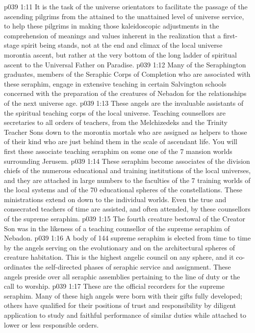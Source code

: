 \vs p039 1:11 It is the task of the universe orientators to facilitate the passage of the ascending pilgrims from the attained to the unattained level of universe service, to help these pilgrims in making those kaleidoscopic adjustments in the comprehension of meanings and values inherent in the realization that a first\hyp{}stage spirit being stands, not at the end and climax of the local universe morontia ascent, but rather at the very bottom of the long ladder of spiritual ascent to the Universal Father on Paradise.
\vs p039 1:12 Many of the Seraphington graduates, members of the Seraphic Corps of Completion who are associated with these seraphim, engage in extensive teaching in certain Salvington schools concerned with the preparation of the creatures of Nebadon for the relationships of the next universe age.
\vs p039 1:13 \bibnobreakspace {} These angels are the invaluable assistants of the spiritual teaching corps of the local universe. Teaching counsellors are secretaries to all orders of teachers, from the Melchizedeks and the Trinity Teacher Sons down to the morontia mortals who are assigned as helpers to those of their kind who are just behind them in the scale of ascendant life. You will first  these associate teaching seraphim on some one of the 7 mansion worlds surrounding Jerusem.
\vs p039 1:14 These seraphim become associates of the division chiefs of the numerous educational and training institutions of the local universes, and they are attached in large numbers to the faculties of the 7 training worlds of the local systems and of the 70 educational spheres of the constellations. These ministrations extend on down to the individual worlds. Even the true and consecrated teachers of time are assisted, and often attended, by these counsellors of the supreme seraphim.
\vs p039 1:15 The fourth creature bestowal of the Creator Son was in the likeness of a teaching counsellor of the supreme seraphim of Nebadon.
\vs p039 1:16 \bibnobreakspace {} A body of 144 supreme seraphim is elected from time to time by the angels serving on the evolutionary and on the architectural spheres of creature habitation. This is the highest angelic council on any sphere, and it co\hyp{}ordinates the self\hyp{}directed phases of seraphic service and assignment. These angels preside over all seraphic assemblies pertaining to the line of duty or the call to worship.
\vs p039 1:17 \bibnobreakspace {} These are the official recorders for the supreme seraphim. Many of these high angels were born with their gifts fully developed; others have qualified for their positions of trust and responsibility by diligent application to study and faithful performance of similar duties while attached to lower or less responsible orders.
